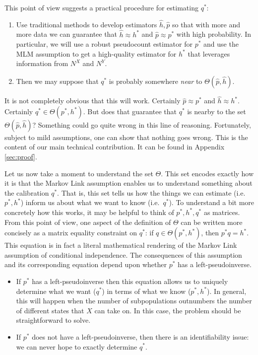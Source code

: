 This point of view suggests a practical procedure for estimating $q^*$:

\begin{enumerate}
    \item Use traditional methods to develop estimators $\hat h,\hat p$ so that with more and more data we can guarantee that $\hat h\approx h^*$ and $\hat p\approx p^*$ with high probability.  In particular, we will use a robust pseudocount estimator for $p^*$ and use the MLM assumption to get a high-quality estimator for $h^*$ that leverages information from $N^X$ and $N^Y$.  
    \item Then we may suppose that $q^*$ is probably somewhere \emph{near} to $\Theta(\hat p,\hat h)$.  
\end{enumerate}

It is not completely obvious that this will work.  Certainly $\hat p\approx p^*$ and $\hat h\approx h^*$.  Certainly $q^*\in \Theta(p^*,h^*)$.  But does that guarantee that $q^*$ is nearby to the set $\Theta(\hat p,\hat h)$?  Something could go quite wrong in this line of reasoning.  Fortunately, subject to mild assumptions, one can show that nothing goes wrong.  This is the content of our main technical contribution.  It can be found in Appendix \ref{sec:proof}.

Let us now take a moment to understand the set $\Theta$.  This set encodes exactly how it is that the Markov Link assumption enables us to understand something about the calibration $q^*$.  That is, this set tells us how the things we can estimate (i.e.\ $p^*,h^*$) inform us about what we want to know (i.e.\ $q^*$).  To understand a bit more concretely how this works, it may be helpful to think of $p^*,h^*,q^*$ as matrices.  From this point of view, one aspect of the definition of $\Theta$ can be written more concisely as a matrix equality constraint on $q^*$: if $q \in \Theta(p^*,h^*)$, then $p^*q=h^*$.  This equation is in fact a literal mathematical rendering of the Markov Link assumption of conditional independence.  The consequences of this assumption and its corresponding equation depend upon whether $p^*$ has a left-pseudoinverse.
\begin{itemize}
    \item If $p^*$ has a left-pseudoinverse then this equation allows us to uniquely determine what we want ($q^*$) in terms of what we know ($p^*,h^*$).  In general, this will happen when the number of subpopulations outnumbers the number of different states that $X$ can take on.  In this case, the problem should be straightforward to solve.   
    \item If $p^*$ does not have a left-pseudoinverse, then there is an identifiability issue: we can never hope to exactly determine $q^*$.  
\end{itemize}

